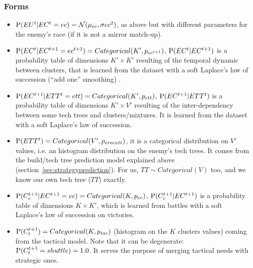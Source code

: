 \subsubsection{Forms}
\begin{itemize}
\item $\mathrm{P}(EU^t | EC^t=ec) = \mathcal{N}(\mu_{ec},\sigma{ec}^2)$, as above but with different parameters for the enemy's race (if it is not a mirror match-up).

\item $\mathrm{P}(EC^t|EC^{t+1}=ec^{t+1}) = Categorical(K',p_{ec^{t+1}})$, $\mathrm{P}(EC^t|EC^{t+1})$ is a probability table of dimensions $K' \times K'$ resulting of the temporal dynamic between clusters, that is learned from the dataset with a soft Laplace's law of succession (``add one'' smoothing) \cite{Jaynes}. 

\item $\mathrm{P}(EC^{t+1}|ETT^t=ett) = Categorical(K',p_{ett})$, $\mathrm{P}(EC^{t+1}|ETT^t)$ is a probability table of dimensions $K' \times V'$ resulting of the inter-dependency between some tech trees and clusters/mixtures. It is learned from the dataset with a soft Laplace's law of succession.

\item $\mathrm{P}(ETT^t) = Categorical(V',p_{eracett})$, it is a categorical distribution on $V'$ values, i.e. an histogram distribution on the enemy's tech trees. It comes from the build/tech tree prediction model explained above (section~\ref{sec:strategyprediction}). For us, $TT \sim Categorical(V)$ too, and we know our own tech tree ($TT$) exactly.

\item $\mathrm{P}(C_c^{t+1}|EC^{t+1}=ec) = Categorical(K,p_{ec})$, $\mathrm{P}(C_c^{t+1}|EC^{t+1})$ is a probability table of dimensions $K \times K'$, which is learned from battles with a soft Laplace's law of succession on victories. 

\item $\mathrm{P}(C_t^{t+1}) = Categorical(K,p_{tac})$ (histogram on the $K$ clusters values) coming from the tactical model. Note that it can be degenerate: $\mathrm{P}(C_t^{t+1}=shuttle)=1.0$. It serves the purpose of merging tactical needs with strategic ones.


\end{itemize}
